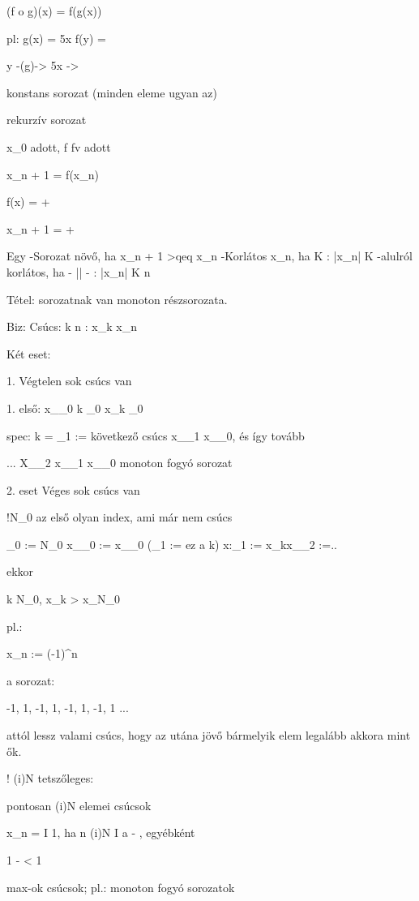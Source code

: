 
(f o g)(x) = f(g(x))

pl: 
g(x) = 5x
f(y) = 

y -(g)-> 5x -> 

konstans sorozat (minden eleme ugyan az)

rekurzív sorozat

x_0 \in {} adott, f fv adott

x_{n + 1} = f(x_n)

f(x) =  + 

x_{n + 1} =  + 

Egy
-Sorozat növő, ha x_{n + 1} >qeq x_n
-Korlátos x_n, ha \exists K \in {} : |x_n| \leq K
-alulról korlátos, ha - || -                : |x_n| \geq K
\forall n \in {}

Tétel:
\forall sorozatnak van monoton részsorozata.

Biz:
Csúcs:
\forakk k \geq n : x_k \leq x_n

Két eset:

1.
Végtelen sok csúcs van

1. első: x_{\nu_0}
\forall k \geq \nu_0 x_k \leq \nu_0

spec: k = \nu_1 := következő csúcs
x_\nu_1 \leq x_\nu_0, és így tovább

... \leq X_\mu_2 \leq x_\mu_1 \leq x_\mu_0 monoton fogyó sorozat


2. eset
Véges sok csúcs van

!N_0 \in {} az első olyan index, ami már nem csúcs

\nu_0 := N_0
x_\nu_0 := x_\nu_0 (\nu_1 := ez a k)
x:\nu_1 := x_kx_\nu_2 :=..

ekkor

\exists k \geq N_0, x_k > x_N_0 


pl.:

x_n := (-1)^n 

a sorozat:

-1, 1, -1, 1, -1, 1, -1, 1 ...

attól lessz valami csúcs, hogy az utána jövő bármelyik elem legalább akkora mint ők.

! (i)N \subset {} tetszőleges:

pontosan (i)N elemei csúcsok

x_n = I  1, ha n \in (i)N
      I  a - , egyébként

1 -  < 1

max-ok csúcsok; pl.: monoton fogyó sorozatok


